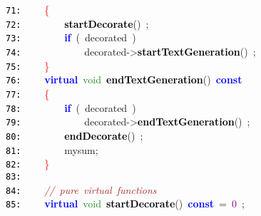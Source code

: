 \documentclass{article}
\begin{document}
\mbox{}\texttt{\textcolor{Black}{71:}} \ \ \ \ \textcolor{Red}{\{}\  \\
\mbox{}\texttt{\textcolor{Black}{72:}} \ \ \ \ \ \ \ \ \textbf{\textcolor{Black}{startDecorate}}\textcolor{BrickRed}{()}\ \textcolor{BrickRed}{;} \\
\mbox{}\texttt{\textcolor{Black}{73:}} \ \ \ \ \ \ \ \ \textbf{\textcolor{Blue}{if}}\ \textcolor{BrickRed}{(}\ decorated\ \textcolor{BrickRed}{)} \\
\mbox{}\texttt{\textcolor{Black}{74:}} \ \ \ \ \ \ \ \ \ \ \ \ decorated\textcolor{BrickRed}{-\textgreater{}}\textbf{\textcolor{Black}{startTextGeneration}}\textcolor{BrickRed}{()}\ \textcolor{BrickRed}{;} \\
\mbox{}\texttt{\textcolor{Black}{75:}} \ \ \ \ \textcolor{Red}{\}} \\
\mbox{}\texttt{\textcolor{Black}{76:}} \ \ \ \ \textbf{\textcolor{Blue}{virtual}}\ \textcolor{ForestGreen}{void}\ \textbf{\textcolor{Black}{\label{test.h:76}endTextGeneration}}\textcolor{BrickRed}{()}\ \textbf{\textcolor{Blue}{const}}\  \\
\mbox{}\texttt{\textcolor{Black}{77:}} \ \ \ \ \textcolor{Red}{\{}\  \\
\mbox{}\texttt{\textcolor{Black}{78:}} \ \ \ \ \ \ \ \ \textbf{\textcolor{Blue}{if}}\ \textcolor{BrickRed}{(}\ decorated\ \textcolor{BrickRed}{)} \\
\mbox{}\texttt{\textcolor{Black}{79:}} \ \ \ \ \ \ \ \ \ \ \ \ decorated\textcolor{BrickRed}{-\textgreater{}}\textbf{\textcolor{Black}{endTextGeneration}}\textcolor{BrickRed}{()}\ \textcolor{BrickRed}{;} \\
\mbox{}\texttt{\textcolor{Black}{80:}} \ \ \ \ \ \ \ \ \textbf{\textcolor{Black}{endDecorate}}\textcolor{BrickRed}{()}\ \textcolor{BrickRed}{;} \\
\mbox{}\texttt{\textcolor{Black}{81:}} \ \ \ \ \ \ \ \ mysum\textcolor{BrickRed}{;} \\
\mbox{}\texttt{\textcolor{Black}{82:}} \ \ \ \ \textcolor{Red}{\}} \\
\mbox{}\texttt{\textcolor{Black}{83:}}  \\
\mbox{}\texttt{\textcolor{Black}{84:}} \ \ \ \ \textit{\textcolor{Brown}{//\ pure\ virtual\ functions}} \\
\mbox{}\texttt{\textcolor{Black}{85:}} \ \ \ \ \textbf{\textcolor{Blue}{virtual}}\ \textcolor{ForestGreen}{void}\ \textbf{\textcolor{Black}{startDecorate}}\textcolor{BrickRed}{()}\ \textbf{\textcolor{Blue}{const}}\ \textcolor{BrickRed}{=}\ \textcolor{Purple}{0}\ \textcolor{BrickRed}{;} \\
\end{document}
